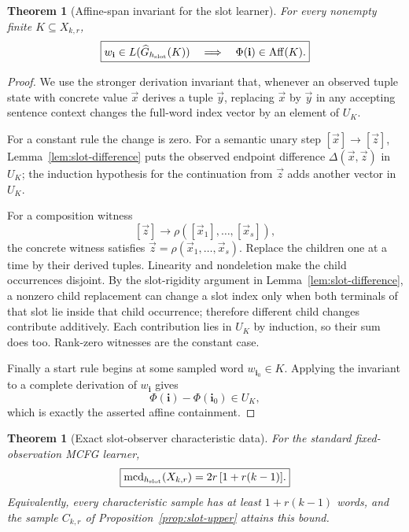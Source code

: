 \documentclass[11pt]{article}
\newtheorem{theorem}[definition]{Theorem}
\begin{document}
\begin{theorem}[Affine-span invariant for the slot learner]
\label{thm:slot-affine-invariant}
For every nonempty finite $K\subseteq X_{k,r}$,
\[
 \boxed{
   w_{\mathbf i}\in L(\widehat G_{h_{\rm slot}}(K))
   \quad\Longrightarrow\quad
   \Phi(\mathbf i)\in\operatorname{Aff}(K).
 }
\]
\end{theorem}

\begin{proof}
We use the stronger derivation invariant that, whenever an observed tuple state
with concrete value $\vec x$ derives a tuple $\vec y$, replacing $\vec x$ by
$\vec y$ in any accepting sentence context changes the full-word index vector
by an element of $U_K$.

For a constant rule the change is zero.  For a semantic unary step
$[\vec x]\to[\vec z]$, Lemma~\ref{lem:slot-difference} puts the observed
endpoint difference $\Delta(\vec x,\vec z)$ in $U_K$; the induction hypothesis
for the continuation from $\vec z$ adds another vector in $U_K$.

For a composition witness
\[
 [\vec z]\to\rho([\vec x_1],\ldots,[\vec x_s]),
\]
the concrete witness satisfies
$\vec z=\rho(\vec x_1,\ldots,\vec x_s)$.  Replace the children one at a time by
their derived tuples.  Linearity and nondeletion make the child occurrences
disjoint.  By the slot-rigidity argument in
Lemma~\ref{lem:slot-difference}, a nonzero child replacement can change a slot
index only when both terminals of that slot lie inside that child occurrence;
therefore different child changes contribute additively.  Each contribution
lies in $U_K$ by induction, so their sum does too.  Rank-zero witnesses are the
constant case.

Finally a start rule begins at some sampled word $w_{\mathbf i_0}\in K$.
Applying the invariant to a complete derivation of $w_{\mathbf i}$ gives
\[
  \Phi(\mathbf i)-\Phi(\mathbf i_0)\in U_K,
\]
which is exactly the asserted affine containment.
\end{proof}

\begin{theorem}[Exact slot-observer characteristic data]
\label{thm:slot-exact}
For the standard fixed-observation MCFG learner,
\[
 \boxed{
  \operatorname{mcd}_{h_{\rm slot}}(X_{k,r})
  =2r\,[1+r(k-1)].
 }
\]
Equivalently, every characteristic sample has at least
$1+r(k-1)$ words, and the sample $C_{k,r}$ of
Proposition~\ref{prop:slot-upper} attains this bound.
\end{theorem}
\end{document}
